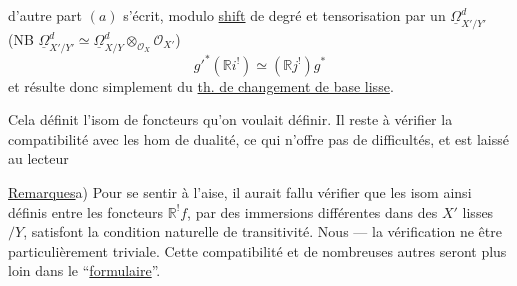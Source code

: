 d'autre part $(a)$ s'écrit, modulo \uline{shift} de degré et tensorisation par  un $\underline\Omega^d_{X'/Y'}$
(NB $\underline\Omega^d_{X'/Y'}\simeq\underline\Omega^d_{X/Y}\otimes_{\mathcal O_X}\mathcal O_{X'}$)
\[
g'^*(\mathbb{R}i^!)\simeq(\mathbb{R}j^!)g^*
\]
et résulte donc simplement du \uline{th. de changement de base lisse}.

Cela définit l'isom de foncteurs qu'on voulait définir. Il reste à vérifier la compatibilité avec les hom de dualité, ce qui n'offre pas de difficultés, et est laissé au lecteur \unsure{\ldots}

\uline{Remarques}\quad a) Pour se sentir à l'aise, il aurait fallu vérifier que les isom ainsi définis entre les foncteurs $\mathbb{R}^!f$, par des immersions différentes dans des $X'$ lisses $/Y$, satisfont la condition naturelle de transitivité.
Nous  --- la vérification ne  être particulièrement triviale. Cette compatibilité et de nombreuses autres seront  plus loin dans le ``\uline{formulaire}''.
